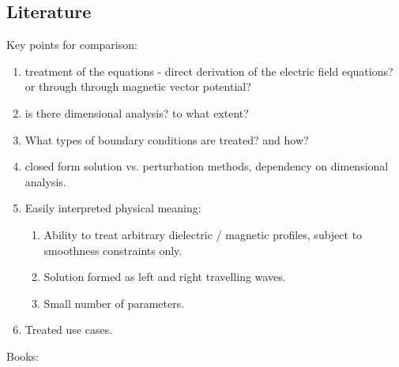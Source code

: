 \documentclass[twocolumn,secnumarabic,amssymb, nobibnotes, aps, prd]{revtex4-1}
\begin{document}
\subsection{Literature}
Key points for comparison:
\begin{enumerate} 
\item treatment of the equations - direct derivation of the electric field equations? or through through magnetic vector potential?
\item is there dimensional analysis?  to what extent?
\item What types of boundary conditions are treated? and how?
\item closed form solution vs. perturbation methods, dependency on  dimensional analysis.
\item Easily interpreted physical meaning:
\begin{enumerate}
\item Ability to treat arbitrary dielectric / magnetic profiles, subject to smoothness constraints only.
\item Solution formed as left and right travelling waves.
\item Small number of parameters. 
\end{enumerate} 
\item Treated use cases.
\end{enumerate}
Books:
\end{document}
